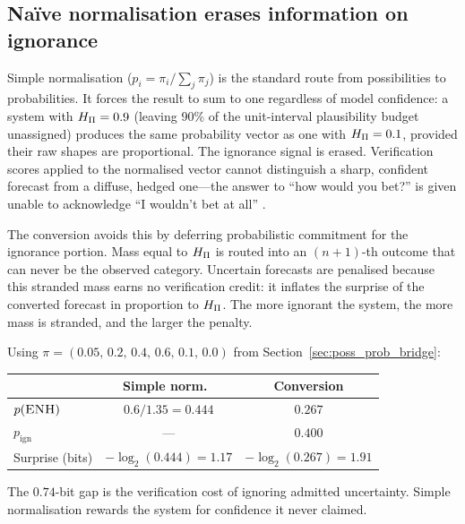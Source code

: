 \subsection{Na\"ive normalisation erases information on ignorance}%
\label{sec:naive_normalisation}

Simple normalisation ($p_i = \pi_i / \sum_j \pi_j$) is the standard
route from possibilities to probabilities. It forces the result to sum
to one regardless of model confidence: a system with $H_{\Pi} = 0.9$
(leaving 90\% of the unit-interval plausibility budget unassigned)
produces the same probability vector as one with $H_{\Pi} = 0.1$,
provided their raw shapes are proportional.
The ignorance signal is erased.
Verification scores
applied to the normalised vector cannot distinguish a sharp, confident
forecast from a diffuse, hedged one---the answer to ``how would you
bet?'' is given unable to acknowledge
``I wouldn't bet at all'' \citep{Van-Schaeybroeck2016-sl}.

The conversion avoids this by deferring
probabilistic commitment for the ignorance portion. Mass equal to
$H_{\Pi}$ is routed into an $(n{+}1)$-th outcome that can never be the
observed category. Uncertain forecasts are penalised because this
stranded mass earns no verification credit: it inflates the surprise
of the converted forecast in proportion to $H_{\Pi}$. The more ignorant
the system, the more mass is stranded, and the larger the penalty.

\begin{workedexample}
Using $\pi = (0.05,\, 0.2,\, 0.4,\allowbreak\, 0.6,\, 0.1,\, 0.0)$
from Section~\ref{sec:poss_prob_bridge}:

\begin{center}
\small
\begin{tabular}{lcc}
\toprule
 & Simple norm.\ & Conversion \\
\midrule
$p(\textsc{ENH})$ & $0.6/1.35 = 0.444$ & $0.267$ \\
$p_{\mathrm{ign}}$ & --- & $0.400$ \\
Surprise (bits) & $-\log_2(0.444) = 1.17$ & $-\log_2(0.267) = 1.91$ \\
\bottomrule
\end{tabular}
\end{center}

\noindent The $0.74$-bit gap is the verification
cost of ignoring admitted uncertainty.
Simple normalisation rewards the system for
confidence it never claimed.
\end{workedexample}

